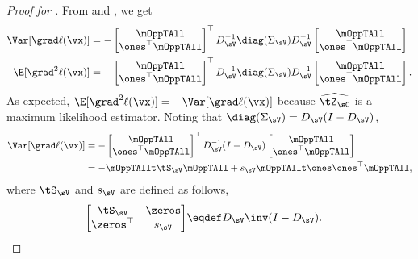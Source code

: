 \begin{proof}[Proof for ]
From  and , we get
  \begin{align*}
    \Var [\grad \ell(\vx)] &= -
        \begin{bmatrix}
          \mOppTAll \\
          \ones^\top \mOppTAll
        \end{bmatrix}^\top
          D_{\sV}^{-1} \diag(\Sigma_\sV) D_{\sV}^{-1} 
        \begin{bmatrix}
          \mOppTAll \\
          \ones^\top \mOppTAll
        \end{bmatrix} \\
        \E[\grad^2 \ell(\vx)] 
        &= \hphantom{-}
        \begin{bmatrix}
          \mOppTAll \\
          \ones^\top \mOppTAll
        \end{bmatrix}^\top
          D_{\sV}^{-1} \diag(\Sigma_\sV) D_{\sV}^{-1} 
        \begin{bmatrix}
          \mOppTAll \\
          \ones^\top \mOppTAll
        \end{bmatrix}.
  \end{align*}
As expected, $\E[\grad^2 \ell(\vx)] = -\Var [\grad \ell(\vx)]$ because
$\widehat{\tZ_\sC}$ is a maximum likelihood estimator. 
Noting that $\diag(\Sigma_\sV) = D_\sV (I - D_\sV)$, 
\begin{align*}
  \Var [\grad \ell(\vx)] &=
      - \begin{bmatrix}
        \mOppTAll \\
        \ones^\top \mOppTAll
      \end{bmatrix}^\top
        D_{\sV}^{-1} (I - D_\sV) 
      \begin{bmatrix}
        \mOppTAll \\
        \ones^\top \mOppTAll
      \end{bmatrix} \\
   &=
    - \mOppTAllt \tS_\sV \mOppTAll + s_\sV \mOppTAllt \ones \ones^\top \mOppTAll,
\end{align*}
where $\tS_\sV$ and $s_\sV$ are defined as follows,
\begin{align*}
  \begin{bmatrix}
          \tS_\sV & \zeros \\
          \zeros^\top & s_\sV
  \end{bmatrix}
  &\eqdef D_\sV\inv (I - D_\sV).
\end{align*}


\end{proof}
